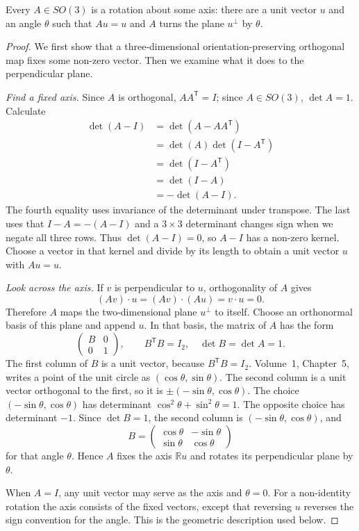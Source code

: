 \begin{lemma}[Euler]\label{lem:euler}
Every $A\in SO(3)$ is a rotation about some axis: there are a unit vector $u$ and an angle $\theta$ such that $Au=u$ and $A$ turns the plane $u^\perp$ by $\theta$.
\end{lemma}
\begin{proof}
We first show that a three-dimensional orientation-preserving
orthogonal map fixes some non-zero vector. Then we examine what it does
to the perpendicular plane.

\emph{Find a fixed axis.}
Since $A$ is orthogonal, $AA^{\mathsf T}=I$; since
$A\in SO(3)$, $\det A=1$. Calculate
\[
\begin{aligned}
\det(A-I)
 &=\det(A-AA^{\mathsf T})\\
 &=\det(A)\det(I-A^{\mathsf T})\\
 &=\det(I-A^{\mathsf T})\\
 &=\det(I-A)\\
 &=-\det(A-I).
\end{aligned}
\]
The fourth equality uses invariance of the determinant under
transpose. The last uses that $I-A=-(A-I)$ and a $3\times3$
determinant changes sign when we negate all three rows.
Thus $\det(A-I)=0$, so $A-I$ has a non-zero kernel.
Choose a vector in that kernel and divide by its length to obtain
a unit vector $u$ with $Au=u$.

\emph{Look across the axis.}
If $v$ is perpendicular to $u$, orthogonality of $A$ gives
\[
(Av)\cdot u=(Av)\cdot(Au)=v\cdot u=0.
\]
Therefore $A$ maps the two-dimensional plane $u^\perp$ to itself.
Choose an orthonormal basis of this plane and append $u$.
In that basis, the matrix of $A$ has the form
\[
\begin{pmatrix}B&0\\0&1\end{pmatrix},
\qquad B^{\mathsf T}B=I_2,\quad \det B=\det A=1.
\]
The first column of $B$ is a unit vector, because $B^{\mathsf T}B=I_2$. Volume~1, Chapter~5, writes a point of the unit circle as $(\cos\theta,\sin\theta)$. The second column is a unit vector orthogonal to the first, so it is $\pm(-\sin\theta,\cos\theta)$. The choice $(-\sin\theta,\cos\theta)$ has determinant $\cos^2\theta+\sin^2\theta=1$. The opposite choice has determinant $-1$. Since $\det B=1$, the second column is $(-\sin\theta,\cos\theta)$, and
\[
B=\begin{pmatrix}
\cos\theta&-\sin\theta\\
\sin\theta&\cos\theta
\end{pmatrix}
\]
for that angle $\theta$. Hence $A$ fixes the axis $\mathbb Ru$
and rotates its perpendicular plane by $\theta$.

When $A=I$, any unit vector may serve as the axis and
$\theta=0$. For a non-identity rotation the axis consists of the
fixed vectors, except that reversing $u$ reverses the sign convention
for the angle. This is the geometric description used below.
\end{proof}

